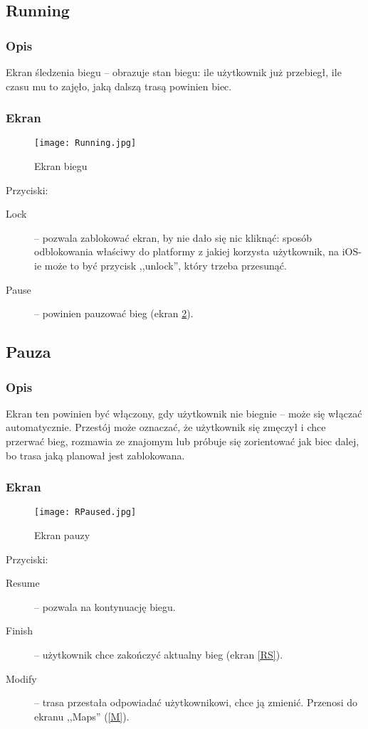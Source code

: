 \subsection{Running}
\subsubsection{Opis}
\noindent Ekran śledzenia biegu -- obrazuje stan biegu: ile użytkownik już przebiegł, ile czasu mu to zajęło, jaką dalszą trasą powinien biec.
\subsubsection{Ekran}
\begin{figure}[b!]
  \texttt{[image: Running.jpg]}
  \caption{Ekran biegu}
  \label{R}
\end{figure}
Przyciski:\\
\begin{description}
  \item[Lock] -- pozwala zablokować ekran, by nie dało się nic kliknąć: sposób odblokowania właściwy do platformy z jakiej korzysta użytkownik, na iOS-ie może to być przycisk ,,unlock'', który trzeba przesunąć.
  \item[Pause] -- powinien pauzować bieg (ekran \ref{RP}).
\end{description}
\subsection{Pauza}
\subsubsection{Opis}
\noindent Ekran ten powinien być włączony, gdy użytkownik nie biegnie -- może się włączać automatycznie. Przestój może oznaczać, że użytkownik się zmęczył i chce przerwać bieg, rozmawia ze znajomym lub próbuje się zorientować jak biec dalej, bo trasa jaką planował jest zablokowana.
\subsubsection{Ekran}
\begin{figure}[b!]
  \texttt{[image: RPaused.jpg]}
  \caption{Ekran pauzy}
  \label{RP}
\end{figure}
Przyciski:\\
\begin{description}
  \item[Resume] -- pozwala na kontynuację biegu.
  \item[Finish] -- użytkownik chce zakończyć aktualny bieg (ekran \ref{RS}).
  \item[Modify] -- trasa przestała odpowiadać użytkownikowi, chce ją zmienić. Przenosi do ekranu ,,Maps'' (\ref{M}).
\end{description}
